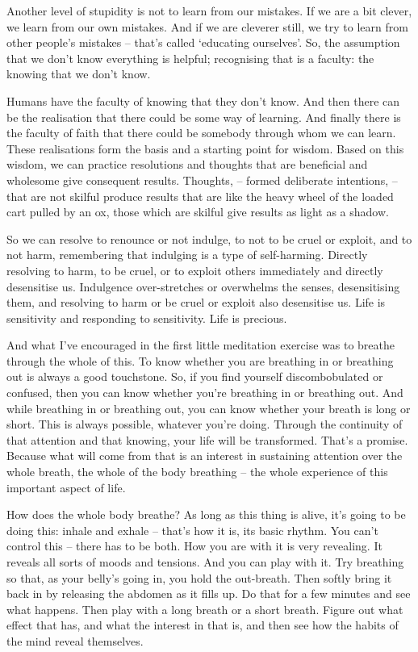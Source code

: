 Another level of stupidity is not to learn from our mistakes. If we are a bit
clever, we learn from our own mistakes. And if we are cleverer still, we try to
learn from other people's mistakes -- that's called `educating ourselves'. So,
the assumption that we don't know everything is helpful; recognising that is a
faculty: the knowing that we don't know.

Humans have the faculty of knowing that they don't know. And then there can be
the realisation that there could be some way of learning. And 
finally there is the faculty of faith that there could be somebody through whom we can learn. These realisations form the
basis and a starting point for wisdom. Based on this wisdom, we can practice resolutions and thoughts
that are beneficial and wholesome give consequent results. Thoughts, -- formed
deliberate intentions, -- that are not skilful produce results that are like the heavy
wheel of the loaded cart pulled by an ox, those which are skilful give results as light as a
shadow.

So we can resolve to renounce or not indulge, to not to be cruel or
exploit, and to not harm, remembering that indulging is a type of self-harming.
Directly resolving to harm, to be cruel, or to exploit others immediately and directly desensitise us.
Indulgence over-stretches or overwhelms the senses, desensitising them, and
resolving to harm or be cruel or exploit also desensitise us. Life is
sensitivity and responding to sensitivity. Life is precious.

\enlargethispage{\baselineskip}

And what I've encouraged in the first little meditation exercise was to
breathe through the whole of this. To know whether you are breathing in or
breathing out is always a good touchstone. So, if you find yourself
discombobulated or confused, then you can know whether you're breathing in or
breathing out. And while breathing in or breathing out, you can know whether
your breath is long or short. This is always possible, whatever you're doing.
Through the continuity of that attention and that knowing, your life will be
transformed. That's a promise. Because what will come from that is an interest
in sustaining attention over the whole breath, the whole of the body breathing
-- the whole experience of this important aspect of life.

How does the whole body breathe? As long as this thing is alive, it's going to
be doing this: inhale and exhale -- that's how it is, its basic rhythm. You
can't control this -- there has to be both. How you are with it is very
revealing. It reveals all sorts of moods and tensions. And you can play with it.
Try breathing so that, as your belly's going in, you hold the out-breath. Then
softly bring it back in by releasing the abdomen as it fills up. Do that for a
few minutes and see what happens. Then play with a long breath or a short
breath. Figure out what effect that has, and what the interest in that is, and
then see how the habits of the mind reveal themselves.

